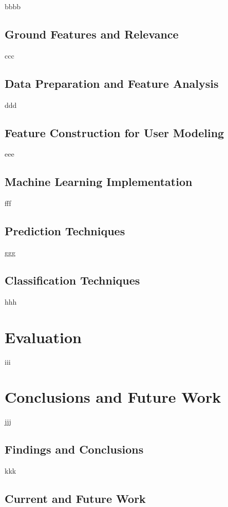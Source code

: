 \documentclass[conference]{csce}
\begin{document}
bbbb

\subsection{Ground Features and Relevance} 

ccc

\subsection{Data Preparation and Feature Analysis}
ddd

\subsection{Feature Construction for User Modeling}
eee

\subsection{Machine Learning Implementation}
fff

\subsection*{Prediction Techniques}

ggg

\subsection*{Classification Techniques}

hhh

\section{Evaluation}
iii

\section{Conclusions and Future Work}

jjj  

\subsection{Findings and Conclusions}

kkk

\subsection{Current and Future Work}
\end{document}
